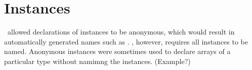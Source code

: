 
\section{Instances}
\label{sec:instances}

\CAST\ allowed declarations of instances to be anonymous, 
which would result in automatically generated names such as .
\hac, however, requires all instances to be named.  
Anonymous instances were sometimes used to declare 
arrays of a particular type without namimng the instances.
(Example?)


